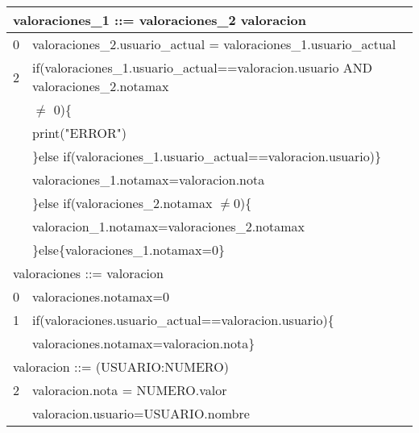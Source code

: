 \begin{problem}[2]
\begin{tabular}{|c|l|}
\hline
\multicolumn{2}{|l|}{valoraciones\_1 ::= valoraciones\_2 valoracion} \\
\hline
0 & valoraciones\_2.usuario\_actual = valoraciones\_1.usuario\_actual\\
\hline
2 & if(valoraciones\_1.usuario\_actual==valoracion.usuario AND valoraciones\_2.notamax\\& $\neq$ 0)\{\\ &
print("ERROR")\\&
\}else if(valoraciones\_1.usuario\_actual==valoracion.usuario)\}\\&
valoraciones\_1.notamax=valoracion.nota\\&
\}else if(valoraciones\_2.notamax $\neq$0)\{\\&
valoracion\_1.notamax=valoraciones\_2.notamax\\&
\}else\{valoraciones\_1.notamax=0\}\\
\hline
\multicolumn{2}{|l|}{valoraciones ::= valoracion} \\
\hline
 0 & valoraciones.notamax=0 \\
 \hline
 1 & if(valoraciones.usuario\_actual==valoracion.usuario)\{\\ &
 valoraciones.notamax=valoracion.nota\}\\
\hline
\multicolumn{2}{|l|}{valoracion ::= (USUARIO:NUMERO)} \\
\hline
 2 & valoracion.nota = NUMERO.valor\\ & valoracion.usuario=USUARIO.nombre\\
 \hline

\end{tabular}

\end{problem}


